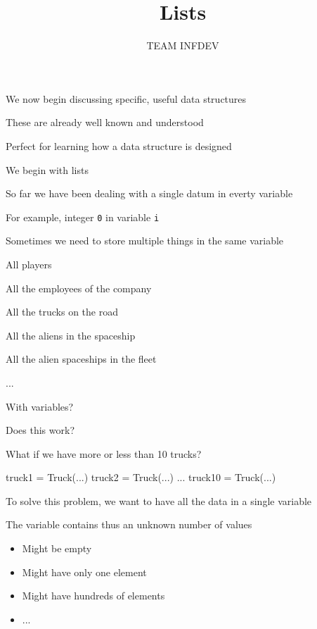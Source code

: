 \documentclass{beamer}
\title{Lists}
\author{TEAM INFDEV}
\institute{Hogeschool Rotterdam \\ 
Rotterdam, Netherlands}
\date{}
\begin{document}
\maketitle

\begin{slide}{
\item We now begin discussing specific, useful data structures
\item These are already well known and understood
\item Perfect for learning how a data structure is designed
\item We begin with lists
}\end{slide}

\begin{slide}{
\item So far we have been dealing with a single datum in everty variable
\item For example, integer \texttt{0} in variable \texttt{i}
\item Sometimes we need to store multiple things in the same variable
}\end{slide}

\begin{slide}{
\item All players
\item All the employees of the company
\item All the trucks on the road
\item All the aliens in the spaceship
\item All the alien spaceships in the fleet
\item ...
}\end{slide}

\begin{frame}[fragile]{With variables?}
\begin{codewithblock}{\pause \item Does this work? \item What if we have more or less than 10 trucks?}
truck1 = Truck(...)
truck2 = Truck(...)
...
truck10 = Truck(...)
\end{codewithblock}
\end{frame}

\begin{slide}{
\item To solve this problem, we want to have all the data in a single variable
\item The variable contains thus an unknown number of values
\begin{itemize}
\item Might be empty
\item Might have only one element
\item Might have hundreds of elements
\item ...
\end{itemize}
}\end{slide}
\end{document}
